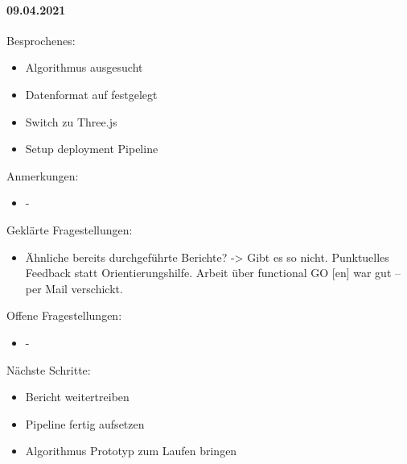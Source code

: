 \paragraph{09.04.2021}
Besprochenes:
\begin{itemize}
  \item Algorithmus ausgesucht
  \item Datenformat auf  festgelegt
  \item Switch zu Three.js
  \item Setup deployment Pipeline
\end{itemize}
Anmerkungen:
\begin{itemize}
  \item -
\end{itemize}
Geklärte Fragestellungen:
\begin{itemize}
  \item Ähnliche bereits durchgeführte Berichte? -> Gibt es so nicht. Punktuelles Feedback statt Orientierungshilfe. Arbeit über functional GO [en] war gut – per Mail verschickt.
\end{itemize}
Offene Fragestellungen:
\begin{itemize}
  \item -
\end{itemize}
Nächste Schritte:
\begin{itemize}
  \item Bericht weitertreiben
  \item Pipeline fertig aufsetzen
  \item Algorithmus Prototyp zum Laufen bringen
\end{itemize}

\newpage

